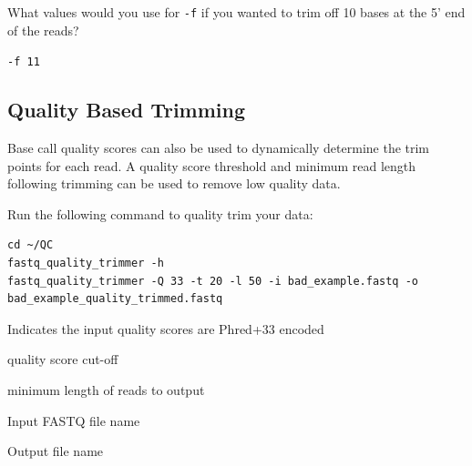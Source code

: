 \begin{questions}
What values would you use for \texttt{-f} if you wanted to trim off 10 bases at
the 5' end of the reads?
\begin{answer}
\texttt{-f 11}
\end{answer}
\end{questions}

\subsection{Quality Based Trimming}
Base call quality scores can also be used to dynamically determine the trim
points for each read. A quality score threshold and minimum read length
following trimming can be used to remove low quality data.

\begin{steps}
Run the following command to quality trim your data:
\begin{lstlisting}
cd ~/QC
fastq_quality_trimmer -h
fastq_quality_trimmer -Q 33 -t 20 -l 50 -i bad_example.fastq -o bad_example_quality_trimmed.fastq
\end{lstlisting}
\end{steps}

\begin{note}
\begin{description}[style=multiline,labelindent=0cm,align=right,leftmargin=\descriptionlabelspace,rightmargin=1.5cm,font=\ttfamily]
 \item[-Q 33] Indicates the input quality scores are Phred+33 encoded
 \item[-t] quality score cut-off
 \item[-l] minimum length of reads to output
 \item[-i] Input FASTQ file name
 \item[-o] Output file name
\end{description}
\end{note}

